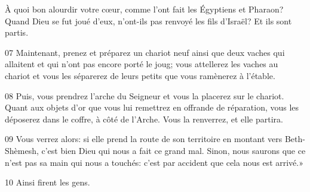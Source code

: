 À quoi bon alourdir votre cœur, comme l’ont fait les Égyptiens et Pharaon? Quand Dieu se fut joué d’eux, n’ont-ils pas renvoyé les fils d’Israël? Et ils sont partis.

07 Maintenant, prenez et préparez un chariot neuf ainsi que deux vaches qui allaitent et qui n’ont pas encore porté le joug; vous attellerez les vaches au chariot et vous les séparerez de leurs petits que vous ramènerez à l’étable.

08 Puis, vous prendrez l’arche du Seigneur et vous la placerez sur le chariot. Quant aux objets d’or que vous lui remettrez en offrande de réparation, vous les déposerez dans le coffre, à côté de l’Arche. Vous la renverrez, et elle partira.

09 Vous verrez alors: si elle prend la route de son territoire en montant vers Beth-Shèmesh, c’est bien Dieu qui nous a fait ce grand mal. Sinon, nous saurons que ce n’est pas sa main qui nous a touchés: c’est par accident que cela nous est arrivé.»

10 Ainsi firent les gens.
